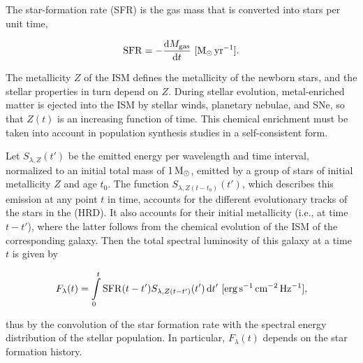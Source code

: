 \documentclass[a4paper,11pt]{article}
\begin{document}
{\noindent}The star-formation rate (SFR) is the gas mass that is converted into stars per unit time,

\begin{align*}
    \mathrm{SFR} = -\frac{\mathrm{d}M_\mathrm{gas}}{\mathrm{d}t} ~ [{\rm M_\odot\,yr^{-1}}].
\end{align*}

{\noindent}The metallicity $Z$ of the ISM defines the metallicity of the newborn stars, and the stellar properties in turn depend on $Z$. During stellar evolution, metal-enriched matter is ejected into the ISM by stellar winds, planetary nebulae, and SNe, so that $Z(t)$ is an increasing function of time. This chemical enrichment must be taken into account in population synthesis studies in a self-consistent form.

{\noindent}Let $S_{\lambda,Z}(t')$ be the emitted energy per wavelength and time interval, normalized to an initial total mass of $1\,{\rm M_\odot}$, emitted by a group of stars of initial metallicity $Z$ and age $t_0$. The function $S_{\lambda,Z(t-t_0)}(t')$, which describes this emission at any point $t$ in time, accounts for the different evolutionary tracks of the stars in the (HRD). It also accounts for their initial metallicity (i.e., at time $t-t'$), where the latter follows from the chemical evolution of the ISM of the corresponding galaxy. Then the total spectral luminosity of this galaxy at a time $t$ is given by

\begin{align*}
    F_\lambda(t) = \int\limits_0^t \mathrm{SFR}(t-t')S_{\lambda,Z(t-t')}(t')\,\mathrm{d}t' ~ [{\rm erg\,s^{-1}\,cm^{-2}\,Hz^{-1}}],
\end{align*}

{\noindent}thus by the convolution of the star formation rate with the spectral energy distribution of the stellar population. In particular, $F_\lambda(t)$ depends on the star formation history.
\end{document}
